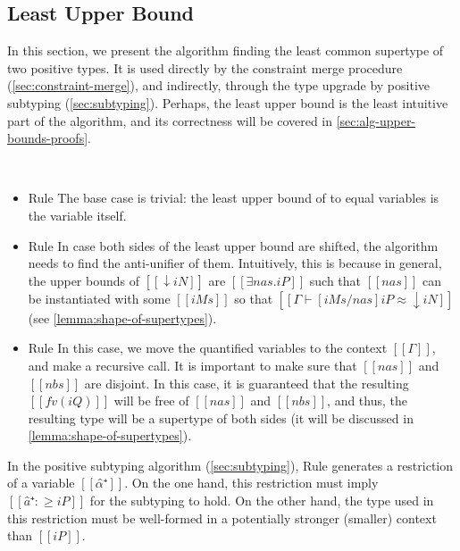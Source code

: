 \documentclass[a4,natbib=false]{article}
\newcommand{\ruleref}[1]{Rule \nameref{#1}}
\begin{document}
\subsection{Least Upper Bound}
\label{sec:lub}

In this section, we present
the algorithm finding the least common supertype of two positive types. 
It is used directly by the constraint merge procedure (\cref{sec:constraint-merge}),
and indirectly, through the type upgrade by positive subtyping
(\cref{sec:subtyping}). Perhaps, the least upper bound is the least 
intuitive part of the algorithm, and its correctness will be covered
in \cref{sec:alg-upper-bounds-proofs}.

\begin{algorithm}
  \hfill\\
  \ottdefnLUBNsub{}
\end{algorithm}

\begin{itemize}
  \item \ruleref{\ottdruleLUBVarLabel}
    The base case is trivial: 
    the least upper bound of to equal variables
    is the variable itself.
  \item \ruleref{\ottdruleLUBShiftLabel}
    In case both sides of the least upper bound are shifted,
    the algorithm needs to find the anti-unifier of them. 
    Intuitively, this is because in general, the upper bounds of
    $[[↓iN]]$ are $[[∃nas.iP]]$ such that 
    $[[nas]]$ can be instantiated with some $[[iMs]]$ so that
    $[[ Γ ⊢ [iMs/nas]iP ≈ ↓iN ]]$ (see \cref{lemma:shape-of-supertypes}).
  \item \ruleref{\ottdruleLUBExistsLabel}
    In this case, we move the quantified variables to the context $[[Γ]]$, 
    and make a recursive call. 
    It is important to make sure that $[[nas]]$ and $[[nbs]]$ are disjoint.
    In this case, it is guaranteed that the resulting 
    $[[fv(iQ)]]$ will be free of $[[nas]]$ and $[[nbs]]$,
    and thus, the resulting type will be a supertype of both sides
    (it will be discussed in \cref{lemma:shape-of-supertypes}).
\end{itemize}


In the positive subtyping algorithm (\cref{sec:subtyping}),
\ruleref{\ottdruleAPUVarLabel} 
generates a restriction of a variable $[[α̂⁺]]$.
On the one hand, this restriction must imply 
$[[â⁺ :≥ iP]]$ for the subtyping to hold.
On the other hand, the type used in this restriction 
must be well-formed in a potentially stronger (smaller) 
context than $[[iP]]$.
\end{document}
